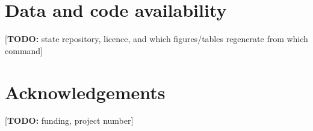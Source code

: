 \documentclass[preprint,3p,number]{elsarticle}
\newif\ifdraft\drafttrue
\newcommand{\todo}[1]{\ifdraft\textcolor{red!60!black}{[\textbf{TODO:} #1]}\fi}
\begin{document}
\section*{Data and code availability}
\todo{state repository, licence, and which figures/tables regenerate from which
command}

\section*{Acknowledgements}
\todo{funding, project number}



\end{document}
